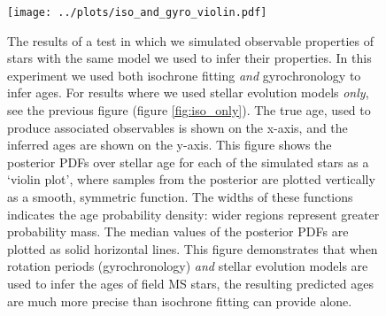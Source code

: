 \begin{figure}
  \caption{
The results of a test in which we simulated observable properties of stars
    with the same model we used to infer their properties.
    In this experiment we used both isochrone fitting {\it and}
    gyrochronology to infer ages.
For results where we used stellar evolution models {\it only}, see the
    previous figure (figure \ref{fig:iso_only}).
The true age, used to produce associated observables is shown on the x-axis,
    and the inferred ages are shown on the y-axis.
This figure shows the posterior PDFs over stellar age for each of the
    simulated stars as a `violin plot', where samples from the posterior are
    plotted vertically as a smooth, symmetric function.
The widths of these functions indicates the age probability density: wider
    regions represent greater probability mass.
The median values of the posterior PDFs are plotted as solid horizontal lines.
    This figure demonstrates that when rotation periods (gyrochronology) {\it
    and} stellar evolution models are used to infer the ages of field MS
    stars, the resulting predicted ages are much more precise
    than isochrone fitting can provide alone.
}
  \centering
    \texttt{[image: ../plots/iso\_and\_gyro\_violin.pdf]}
\label{fig:iso_and_gyro}
\end{figure}


